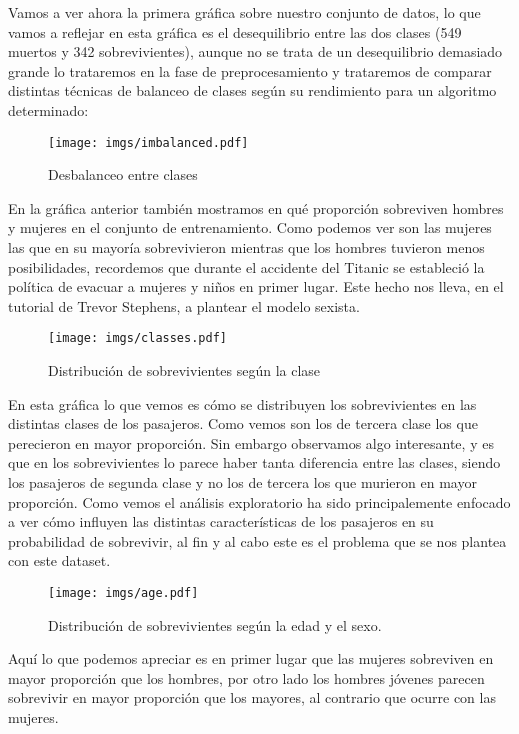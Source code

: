 Vamos a ver ahora la primera gráfica sobre nuestro conjunto de datos, lo que vamos a reflejar en esta gráfica es el desequilibrio entre las dos clases (549 muertos y 342 sobrevivientes), aunque no se trata de un desequilibrio demasiado grande lo trataremos en la fase de preprocesamiento y trataremos de comparar distintas técnicas de balanceo de clases según su rendimiento para un algoritmo determinado:

\begin{figure}[H]
  \centering
  \texttt{[image: imgs/imbalanced.pdf]}
  \caption{Desbalanceo entre clases}
\end{figure}

En la gráfica anterior también mostramos en qué proporción sobreviven hombres y mujeres en el conjunto de entrenamiento. Como podemos ver son las mujeres las que en su mayoría sobrevivieron mientras que los hombres tuvieron menos posibilidades, recordemos que durante el accidente del Titanic se estableció la política de evacuar a mujeres y niños en primer lugar. Este hecho nos lleva, en el tutorial de Trevor Stephens, a plantear el modelo sexista.

\begin{figure}[H]
  \centering
  \texttt{[image: imgs/classes.pdf]}
  \caption{Distribución de sobrevivientes según la clase}
\end{figure}

En esta gráfica lo que vemos es cómo se distribuyen los sobrevivientes en las distintas clases de los pasajeros. Como vemos son los de tercera clase los que perecieron en mayor proporción. Sin embargo observamos algo interesante, y es que en los sobrevivientes lo parece haber tanta diferencia entre las clases, siendo los pasajeros de segunda clase y no los de tercera los que murieron en mayor proporción. Como vemos el análisis exploratorio ha sido principalemente enfocado a ver cómo influyen las distintas características de los pasajeros en su probabilidad de sobrevivir, al fin y al cabo este es el problema que se nos plantea con este dataset.\\

\begin{figure}[H]
  \centering
  \texttt{[image: imgs/age.pdf]}
  \caption{Distribución de sobrevivientes según la edad y el sexo.}
\end{figure}

Aquí lo que podemos apreciar es en primer lugar que las mujeres sobreviven en mayor proporción que los hombres, por otro lado los hombres jóvenes parecen sobrevivir en mayor proporción que los mayores, al contrario que ocurre con las mujeres.

